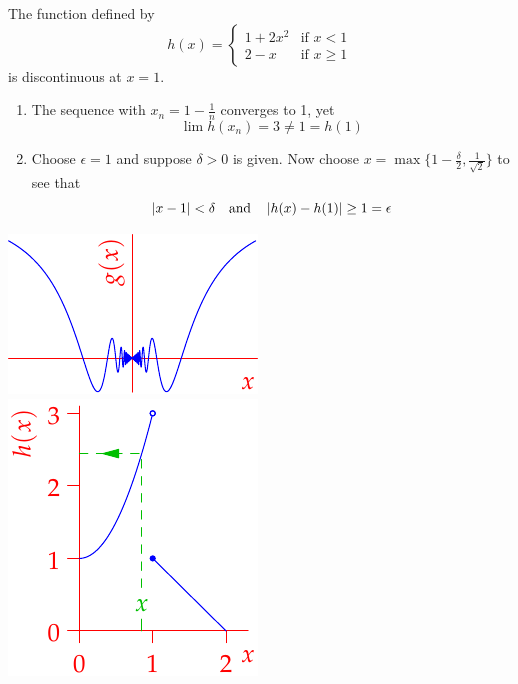 \begin{examples}{}{}
\begin{enumerate}
\begin{minipage}[t]{0.70\linewidth}
  \item The function defined by
  \[h(x)=\begin{cases}
  1+2x^2&\text{if }x<1\\
  2-x&\text{if }x\ge 1
  \end{cases}\]
  is discontinuous at $x=1$.
  \begin{enumerate}
  	\item The sequence with $x_n=1-\frac 1n$ converges to 1, yet
		\[\lim h(x_n)=3\neq 1=h(1)\]
   	\item Choose $\epsilon=1$ and suppose $\delta>0$ is given. Now choose $x=\max\{1-\frac\delta 2,\frac 1{\sqrt 2}\}$ to see that
		\[\left| x-1\right|<\delta\quad\text{and}\quad \left| h(x)-h(1)\right|\ge 1=\epsilon\]
	\end{enumerate}
	\end{minipage}\begin{minipage}[t]{0.29\linewidth}\vspace{0pt}
	\flushright\includegraphics{cont-ex1}\bigbreak
	\includegraphics{cont-ex2}
	\end{minipage}



\end{enumerate}
\end{examples}
